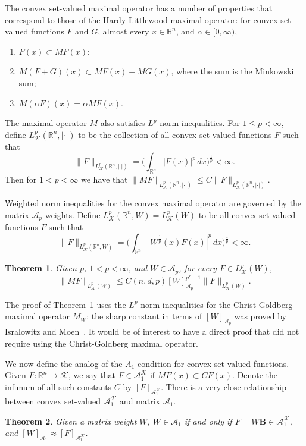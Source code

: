 \documentclass[12pt]{amsart}
\newtheorem{theorem}{Theorem}[section]
\theoremstyle{definition}
\theoremstyle{remark}
\numberwithin{equation}{section}
\newcommand{\rn}{{{\mathbb R}^n}}
\newcommand{\A}{\mathcal A}
\newcommand{\K}{\mathcal K}
\begin{document}
The convex set-valued maximal operator has a number of properties that
correspond to those of the Hardy-Littlewood maximal operator: for
convex set-valued functions $F$ and $G$, almost every $x\in \rn$, and $\alpha \in
[0,\infty)$, 
%
\begin{enumerate}

\item $F(x) \subset MF(x)$;

  \item $M(F+G)(x) \subset MF(x) + MG(x)$, where the sum is the
    Minkowski sum;

  \item $M(\alpha F)(x) = \alpha MF(x)$.
\end{enumerate}
%
The maximal operator $M$ also satisfies $L^p$ norm inequalities.  For
$1\leq p<\infty$, define $L^p_\K(\rn,|\cdot|)$ to be the collection of
all convex set-valued functions $F$ such that
%
\[ \|F\|_{L^p_\K(\rn,|\cdot|)}
  =
  \bigg(\int_\rn |F(x)|^p\,dx\bigg)^{\frac1p} < \infty.  \]
%
Then for $1<p<\infty$ we have that $\|MF\|_{L^p_\K(\rn,|\cdot|)} \leq
C \|F\|_{L^p_\K(\rn,|\cdot|)}$.

Weighted norm inequalities for the convex maximal operator are
governed by the matrix $\A_p$ weights.  Define
$L^p_\K(\rn,W)=L^p_\K(W)$ to be all convex set-valued functions $F$ such
that
%
\[ \|F\|_{L^p_\K(\rn,W)}
  =
  \bigg(\int_\rn |W^{\frac1p}(x)F(x)|^p\,dx\bigg)^{\frac1p} < \infty.  \]

\begin{theorem} \label{thm:convex-max-wts}
 Given $p$, $1<p<\infty$, and $W\in \A_p$, for every $F \in
 L^p_\K(W)$,
 \[ \|MF\|_{L^p_\K(W)}
   \leq
   C(n,d,p)[W]_{\A_p}^{p'-1}\|F\|_{L^p_\K(W)}. \]
\end{theorem}

The proof of Theorem~\ref{thm:convex-max-wts} uses the $L^p$ norm
inequalities for the Christ-Goldberg maximal operator $M_W$; the sharp
constant in terms of $[W]_{\A_p}$ was proved by Isralowitz and
Moen~\cite{MR4030471}.  It would be of interest to have a direct proof that
did not require using the Christ-Goldberg maximal operator.

We now define the analog of the $A_1$ condition for convex
set-valued functions.  Given $F : \rn \rightarrow \K$, we say that
$F\in \A_1^\K$ if $MF(x) \subset CF(x)$.  Denote the infimum of all
such constants $C$  by $[F]_{\A_1^\K}$.  There is a very close
relationship between convex set-valued $\A_1^\K$ and matrix $\A_1$.

\begin{theorem}
  Given a matrix weight $W$, $W\in \A_1$ if and only if $F=W{\mathbf
    B} \in \A_1^\K$, and $[W]_{\A_1} \approx [F]_{\A_1^\K}$. 
\end{theorem}
\end{document}
